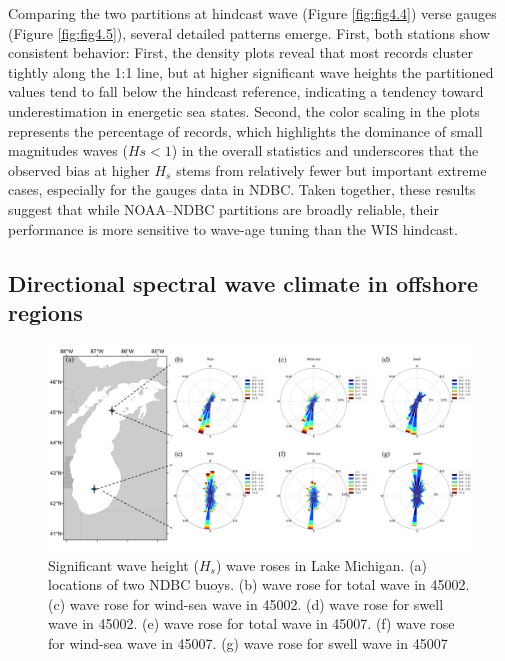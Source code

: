 Comparing the two partitions at hindcast wave (Figure \ref{fig:fig4.4}) verse gauges
(Figure \ref{fig:fig4.5}), several detailed patterns emerge. First, both stations show
consistent behavior: First, the density plots reveal that most records cluster
tightly along the 1:1 line, but at higher significant wave heights the
partitioned values tend to fall below the hindcast reference, indicating a
tendency toward underestimation in energetic sea states. Second, the color
scaling in the plots represents the percentage of records, which highlights the
dominance of small magnitudes waves ($Hs<1$) in the overall statistics and
underscores that the observed bias at higher $H_s$ stems from relatively fewer
but important extreme cases, especially for the gauges data in NDBC. Taken
together, these results suggest that while NOAA–NDBC partitions are broadly
reliable, their performance is more sensitive to wave-age tuning than the WIS
hindcast.

\subsection{Directional spectral wave climate in offshore regions}
\label{Directional spectral wave climate in offshore regions}

\begin{figure}[htbp]
  \centering
  \includegraphics[width=1\textwidth]{chapter4/resources/ndbc_hs_rose.png}
  \caption{Significant wave height ($H_s$) wave roses in Lake Michigan. (a)
  locations of two NDBC buoys. (b) wave rose for total wave in 45002. (c) wave
  rose for wind-sea wave in 45002. (d) wave rose for swell wave in 45002. (e)
  wave rose for total wave in 45007. (f) wave rose for wind-sea wave in 45007.
  (g) wave rose for swell wave in 45007}
  \label{fig:ndbc_hs_rose}
\end{figure}

